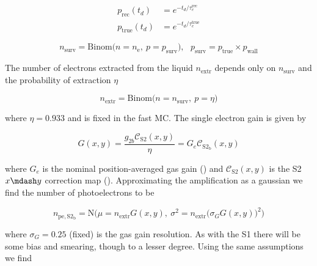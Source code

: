 \begin{equation}
\begin{aligned}
p_{\mathrm{rec}} (t_d) &= e^{-t_d / \tau_{e}^{\mathrm{rec}}} \\
p_{\mathrm{true}} (t_d) &= e^{-t_d / \tau_{e}^{\mathrm{true}}}
\end{aligned}
\label{eq:er_nr_calibrations_parameter_determ_det_phys_prob_elifetime}
\end{equation}

\begin{equation}
n_{\mathrm{surv}} = \mathrm{Binom} \bigg( n = n_{\mathrm{e}},\ p = p_{\mathrm{surv}} \bigg) ,\ \ \
p_{\mathrm{surv}} = p_{\mathrm{true}} \times p_{\mathrm{wall}}
\label{eq:er_nr_calibrations_parameter_determ_det_phys_drift_electrons}
\end{equation}

The number of electrons extracted from the liquid $n_{\mathrm{extr}}$ depends only on $n_{\mathrm{surv}}$ and the probability of
extraction $\eta$

\begin{equation}
n_{\mathrm{extr}} = \mathrm{Binom} \Big( n = n_{\mathrm{surv}},\ p = \eta \Big)
\end{equation}

\noindent where $\eta = 0.933$ and is fixed in the fast MC.  The single electron gain is given by

\begin{equation}
G (x, y) = \frac{g_{2b} \mathcal{C}_{\mathrm{S2}}(x, y)}{\eta} = G_e \mathcal{C}_{\mathrm{S2_b}}(x, y)
\label{eq:er_nr_calibrations_parameter_determ_det_phys_gg}
\end{equation}

\noindent where $G_e$ is the nominal position-averaged gas gain () and
$\mathcal{C}_{\mathrm{S2}}(x, y)$ is the S2 $x \mdash y$ correction map ().  Approximating
the amplification as a gaussian we find the number of photoelectrons to be

\begin{equation}
n_{\mathrm{pe,S2_b}} =  \mathrm{N} \bigg( \mu = n_{\mathrm{extr}} G(x, y),\
\sigma^2 = n_{\mathrm{extr}} \Big( \sigma_{G} G(x, y) \Big)^2 \bigg)
\label{eq:er_nr_calibrations_parameter_determ_det_phys_s2_num_pe}
\end{equation}

\noindent where $\sigma_G = 0.25$ (fixed) is the gas gain resolution.  As with the S1 there will be some bias and smearing, though
to a lesser degree.  Using the same assumptions we find

